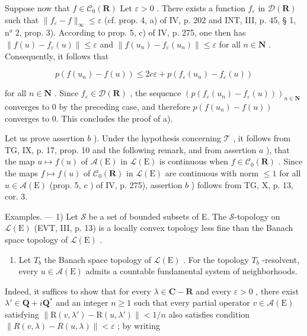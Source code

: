 Suppose now that \(f \in \mathcal{C}_0(\mathbf{R})\) Let \(\varepsilon > 0\) . There exists a function \(f_{\varepsilon}\) in \(\mathcal{D}(\mathbf{R})\) such that \(\| f_{\varepsilon} - f \|_{\infty} \leqslant \varepsilon\) (cf. prop. 4, a) of IV, p. 202 and INT, III, p. 45, § 1, n° 2, prop. 3). According to prop. 5, c) of IV, p. 275, one then has \(\| f(u) - f_{\varepsilon}(u) \| \leqslant \varepsilon\) and \(\| f(u_n) - f_{\varepsilon}(u_n) \| \leqslant \varepsilon\) for all \(n \in \mathbf{N}\) . Consequently, it follows that

\[
p (f (u _ {n}) - f (u)) \leqslant 2 c \varepsilon + p (f _ {\varepsilon} (u _ {n}) - f _ {\varepsilon} (u))
\]

for all \(n \in \mathbf{N}\) . Since \(f_{\varepsilon} \in \mathcal{D}(\mathbf{R})\) , the sequence \((p(f_{\varepsilon}(u_n) - f_{\varepsilon}(u)))_{n \in \mathbf{N}}\) converges to 0 by the preceding case, and therefore \(p(f(u_n) - f(u))\) converges to 0. This concludes the proof of a).

Let us prove assertion \(b\) ). Under the hypothesis concerning \(\mathcal{T}\) , it follows from TG, IX, p. 17, prop. 10 and the following remark, and from assertion \(a\) ), that the map \(u \mapsto f(u)\) of \(\mathcal{A}(\mathrm{E})\) in \(\mathcal{L}(\mathrm{E})\) is continuous when \(f \in \mathcal{C}_0(\mathbf{R})\) . Since the maps \(f \mapsto f(u)\) of \(\mathcal{C}_0(\mathbf{R})\) in \(\mathcal{L}(\mathrm{E})\) are continuous with norm \(\leqslant 1\) for all \(u \in \mathcal{A}(\mathrm{E})\) (prop. 5, \(c\) ) of IV, p. 275), assertion \(b\) ) follows from TG, X, p. 13, cor. 3.

Examples. --- 1) Let \(\mathscr{S}\) be a set of bounded subsets of E. The \(\mathscr{S}\)-topology on \(\mathcal{L}(\mathrm{E})\) (EVT, III, p. 13) is a locally convex topology less fine than the Banach space topology of \(\mathcal{L}(\mathrm{E})\) .

\begin{enumerate}
\def\labelenumi{\arabic{enumi})}
\setcounter{enumi}{1}
\tightlist
\item
  Let \(T_{b}\) the Banach space topology of \(\mathcal{L}(\mathrm{E})\) . For the topology \(T_{b}\) -resolvent, every \(u \in \mathcal{A}(\mathrm{E})\) admits a countable fundamental system of neighborhoods.
\end{enumerate}

Indeed, it suffices to show that for every \(\lambda \in \mathbf{C} - \mathbf{R}\) and every \(\varepsilon > 0\) , there exist \(\lambda' \in \mathbf{Q} + i\mathbf{Q}^*\) and an integer \(n \geqslant 1\) such that every partial operator \(v \in \mathcal{A}(\mathrm{E})\) satisfying \(\| \mathrm{R}(v, \lambda') - \mathrm{R}(u, \lambda')\| < 1/n\) also satisfies condition \(\|R(v,\lambda)-R(u,\lambda)\|<\varepsilon\) ; by writing


